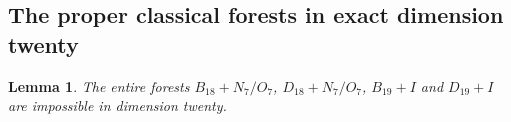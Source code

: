 \documentclass[11pt]{article}
\newtheorem{lemma}[theorem]{Lemma}
\theoremstyle{definition}
\theoremstyle{remark}
\begin{document}

\subsection{The proper classical forests in exact dimension twenty}
\label{app:tail:proper20classical}
\begin{lemma}
\label{app:tail:lem:proper20classical}
The entire forests $B_{18}+N_7/O_7$, $D_{18}+N_7/O_7$,
$B_{19}+I$ and $D_{19}+I$ are impossible in dimension twenty.
\end{lemma}
\end{document}
